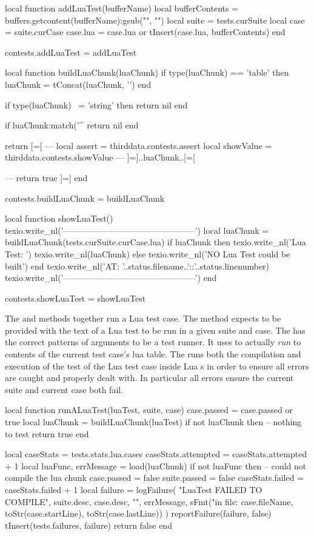 \startLuaCode
local function addLuaTest(bufferName)
  local bufferContents = buffers.getcontent(bufferName):gsub("", "\n")
  local suite = tests.curSuite
  local case  = suite.curCase
  case.lua    = case.lua or {}
  tInsert(case.lua, bufferContents)
end

contests.addLuaTest = addLuaTest

local function buildLuaChunk(luaChunk)
  if type(luaChunk) == 'table' then
    luaChunk = tConcat(luaChunk, '\n')
  end

  if type(luaChunk) ~= 'string' then
    return nil
  end

  if luaChunk:match('^%
    return nil
  end

  return [=[
---
local assert    = thirddata.contests.assert
local showValue = thirddata.contests.showValue
---
]=]..luaChunk..[=[

---
return true
]=]
end

contests.buildLuaChunk = buildLuaChunk

local function showLuaTest()
  texio.write_nl('-----------------------------------------------')
  local luaChunk = buildLuaChunk(tests.curSuite.curCase.lua)
  if luaChunk then
    texio.write_nl('Lua Test: ')
    texio.write_nl(luaChunk)
  else
    texio.write_nl('NO Lua Test could be built')
  end
  texio.write_nl('AT: '..status.filename..'::'..status.linenumber)
  texio.write_nl('-----------------------------------------------')
end

contests.showLuaTest = showLuaTest
\stopLuaCode

The  and  methods together run a 
Lua test case. The  method expects to be provided with 
the text of a Lua test to be run in a given suite and case. The 
 has the correct patterns of arguments to be a 
test runner. It uses  to actually \emph{run} to contents 
of the current test case's lua table. The  runs both the 
compilation and execution of the test of the Lua test case inside Lua 
s in order to ensure all errors are caught and properly dealt 
with. In particular all errors ensure the current suite and current case 
both fail. 

\startLuaCode
local function runALuaTest(luaTest, suite, case)
  case.passed = case.passed or true
  local luaChunk = buildLuaChunk(luaTest)
  if not luaChunk then
    -- nothing to test
    return true
  end

  local caseStats = tests.stats.lua.cases
  caseStats.attempted = caseStats.attempted + 1
  local luaFunc, errMessage = load(luaChunk)
  if not luaFunc then
    -- could not compile the lua chunk
    case.passed  = false
    suite.passed = false
    caseStats.failed = caseStats.failed + 1
    local failure = logFailure(
      "LuaTest FAILED TO COMPILE",
      suite.desc,
      case.desc,
      "",
      errMessage,
      sFmt("in file: %
        case.fileName, toStr(case.startLine), toStr(case.lastLine))
      )
    reportFailure(failure, false)
    tInsert(tests.failures, failure)
    return false
  end

